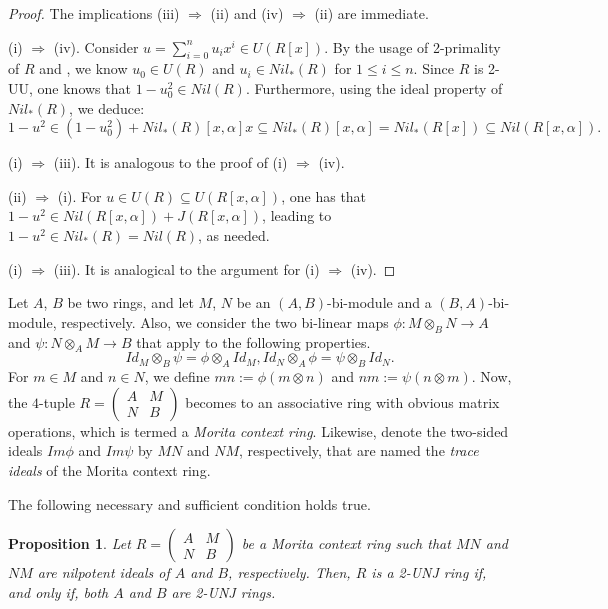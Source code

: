 \documentclass[12pt]{amsart}
\newtheorem{proposition}[theorem]{Proposition}
\theoremstyle{definition}
\begin{document}
\begin{proof}
The implications (iii) $\Rightarrow$ (ii) and (iv) $\Rightarrow$ (ii) are immediate.

(i) $\Rightarrow$ (iv). Consider $u = \sum_{i=0}^n u_ix^i \in U(R[x])$. By the usage of 2-primality of $R$ and \cite[Lemma 2.2]{ccp}, we know $u_0 \in U(R)$ and $u_i \in Nil_*(R)$ for $1 \leq i \leq n$. Since $R$ is 2-UU, one knows that $1-u_0^2 \in Nil(R)$. Furthermore, using the ideal property of $Nil_*(R)$, we deduce:
\[
1-u^2 \in (1-u_0^2) + Nil_*(R)[x,\alpha]x \subseteq Nil_*(R)[x,\alpha] = Nil_*(R[x]) \subseteq Nil(R[x,\alpha]).
\]

(i) $\Rightarrow$ (iii). It is analogous to the proof of (i) $\Rightarrow$ (iv).

(ii) $\Rightarrow$ (i). For $u \in U(R) \subseteq U(R[x,\alpha])$, one has that $1-u^2 \in Nil(R[x,\alpha])+J(R[x,\alpha])$, leading to $1-u^2 \in Nil_*(R) = Nil(R)$, as needed.

(i) $\Rightarrow$ (iii). It is analogical to the argument for (i) $\Rightarrow$ (iv).
\end{proof}

\medskip

Let $A$, $B$ be two rings, and let $M$, $N$ be an $(A,B)$-bi-module and a $(B,A)$-bi-module, respectively. Also, we consider the two bi-linear maps $\phi :M\otimes_{B}N\rightarrow A$ and $\psi:N\otimes_{A}M\rightarrow B$ that apply to the following properties.
$$Id_{M}\otimes_{B}\psi =\phi \otimes_{A}Id_{M},Id_{N}\otimes_{A}\phi =\psi \otimes_{B}Id_{N}.$$
For $m\in M$ and $n\in N$, we define $mn:=\phi (m\otimes n)$ and $nm:=\psi (n\otimes m)$. Now, the $4$-tuple $R=\begin{pmatrix}
	A & M\\
	N & B
\end{pmatrix}$ becomes to an associative ring with obvious matrix operations, which is termed a {\it Morita context ring}. Likewise, denote the two-sided ideals $Im \phi$ and $Im \psi$ by $MN$ and $NM$, respectively, that are named the {\it trace ideals} of the Morita context ring.

The following necessary and sufficient condition holds true.

\begin{proposition}\label{4.7}
Let $R=\left(\begin{array}{ll}A & M \\ N & B\end{array}\right)$ be a Morita context ring such that $MN$ and $NM$ are nilpotent ideals of $A$ and $B$, respectively. Then, $R$ is a 2-UNJ ring if, and only if, both $A$ and $B$ are 2-UNJ rings.
\end{proposition}
\end{document}
